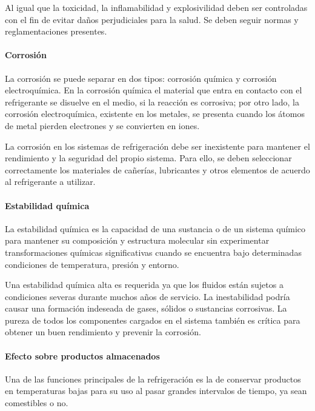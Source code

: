 	Al igual que la toxicidad, la inflamabilidad y explosivilidad deben ser controladas con el fin de evitar daños perjudiciales para la salud. Se deben seguir normas y reglamentaciones presentes.

	\paragraph{Corrosión}  La corrosión se puede separar en dos tipos: corrosión química y corrosión electroquímica. En la corrosión química el material que entra en contacto con el refrigerante se disuelve en el medio, si la reacción es corrosiva; por otro lado, la corrosión electroquímica, existente en los metales, se presenta cuando los átomos de metal pierden electrones y se convierten en iones.
	
	La corrosión en los sistemas de refrigeración debe ser inexistente para mantener el rendimiento y la seguridad del propio sistema. Para ello, se deben seleccionar correctamente los materiales de cañerías, lubricantes y otros elementos de acuerdo al refrigerante a utilizar.  

	\begin{norm}
		\paragraph{Estabilidad química} La estabilidad química es la capacidad de una sustancia o de un sistema químico para mantener su composición y estructura molecular sin experimentar transformaciones químicas significativas cuando se encuentra bajo determinadas condiciones de temperatura, presión y entorno.
	\end{norm}

	Una estabilidad química alta es requerida ya que los fluidos están sujetos a condiciones severas durante muchos años de servicio. La inestabilidad podría causar una formación indeseada de gases, sólidos o sustancias corrosivas. La pureza de todos los componentes cargados en el sistema también es crítica para obtener un buen rendimiento y prevenir la corrosión.

	\paragraph{Efecto sobre productos almacenados} Una de las funciones principales de la refrigeración es la de conservar productos en temperaturas bajas para su uso al pasar grandes intervalos de tiempo, ya sean comestibles o no. 

